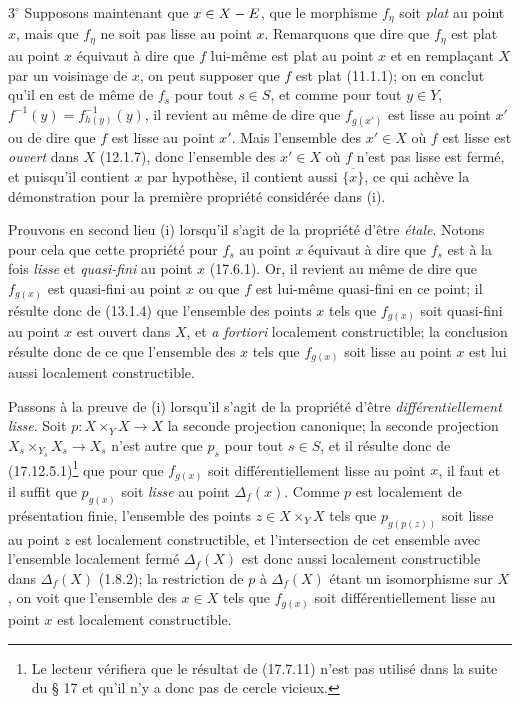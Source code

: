 $3^\circ$ Supposons maintenant que $x\in X- E$, que le morphisme $f_\eta$ soit \emph{plat} au point $x$, mais que $f_\eta$ ne soit pas lisse au point $x$. Remarquons que dire que $f_\eta$ est plat au point $x$ équivaut à dire que $f$ lui-même est plat au point $x$ et en remplaçant $X$ par un voisinage de $x$, on peut supposer que $f$ est plat (11.1.1); on en conclut qu'il en est de même de $f_s$ pour tout $s\in S$, et comme pour tout $y\in Y$, $f^{-1}(y)=f_{h(y)}^{-1}(y)$, il revient au même de dire que $f_{g(x')}$ est lisse au point $x'$ ou de dire que $f$ est lisse au point $x'$. Mais l'ensemble des $x'\in X$ où $f$ est lisse est \emph{ouvert} dans $X$ (12.1.7), donc l'ensemble des $x'\in X$ où $f$ n'est pas lisse est fermé, et puisqu'il contient $x$ par hypothèse, il contient aussi $\overline{\{x\}}$, ce qui achève la démonstration pour la première propriété considérée dans (i).

Prouvons en second lieu (i) lorsqu'il s'agit de la propriété d'être \emph{étale}. Notons pour cela que cette propriété pour $f_s$ au point $x$ équivaut à dire que $f_s$ est à la fois \emph{lisse} et \emph{quasi-fini} au point $x$ (17.6.1). Or, il revient au même de dire que $f_{g(x)}$ est quasi-fini au point $x$ ou que $f$ est lui-même quasi-fini en ce point; il résulte donc de (13.1.4) que l'ensemble des points $x$ tels que $f_{g(x)}$ soit quasi-fini au point $x$ est ouvert dans $X$, et \emph{a fortiori} localement constructible; la conclusion résulte donc de ce que l'ensemble des $x$ tels que $f_{g(x)}$ soit lisse au point $x$ est lui aussi localement constructible.

Passons à la preuve de (i) lorsqu'il s'agit de la propriété d'être \emph{différentiellement lisse}. Soit $p:X\times_Y X\to X$ la seconde projection canonique; la seconde projection $X_s\times_{Y_s}X_s\to X_s$ n'est autre que $p_s$ pour tout $s\in S$, et il résulte donc de (17.12.5.1)\footnote{Le lecteur vérifiera que le résultat de (17.7.11) n'est pas utilisé dans la suite du § 17 et qu'il n'y a donc pas de cercle vicieux.} que pour que $f_{g(x)}$ soit différentiellement lisse au point $x$, il faut et il suffit que $p_{g(x)}$ soit \emph{lisse} au point $\Delta_f(x)$. Comme $p$ est localement de présentation finie, l'ensemble des points $z\in X\times_Y X$ tels que $p_{g(p(z))}$ soit lisse au point $z$ est localement constructible, et l'intersection de cet ensemble avec l'ensemble localement fermé $\Delta_f(X)$ est donc aussi localement constructible dans $\Delta_f(X)$ (1.8.2); la restriction de $p$ à $\Delta_f(X)$ étant un isomorphisme sur $X$, on voit que l'ensemble des $x\in X$ tels que $f_{g(x)}$ soit différentiellement lisse au point $x$ est localement constructible.


